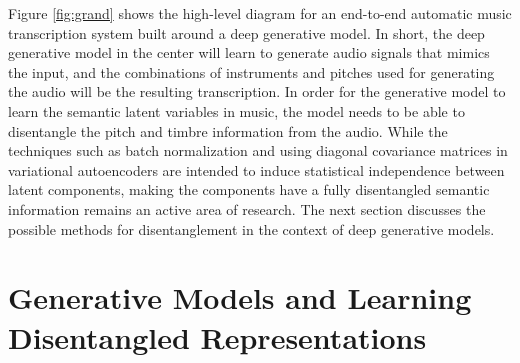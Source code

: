 Figure \ref{fig:grand} shows the high-level diagram for an end-to-end automatic music transcription system built around a deep generative model.
In short, the deep generative model in the center will learn to generate audio signals that mimics the input, and the combinations of instruments and pitches used for generating the audio will be the resulting transcription.
In order for the generative model to learn the semantic latent variables in music, the model needs to be able to disentangle the pitch and timbre information from the audio.
While the techniques such as batch normalization and using diagonal covariance matrices in variational autoencoders are intended to induce statistical independence between latent components,
making the components have a fully disentangled semantic information remains an active area of research.
The next section discusses the possible methods for disentanglement in the context of deep generative models.



\section{Generative Models and Learning Disentangled Representations}

